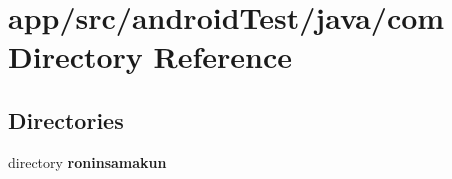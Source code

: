 \section{app/src/android\+Test/java/com Directory Reference}
\label{dir_d547e436cf44e07d29a1a64a15a3b99a}
\subsection*{Directories}
\begin{DoxyCompactItemize}
\item 
directory {\bf roninsamakun}
\end{DoxyCompactItemize}
